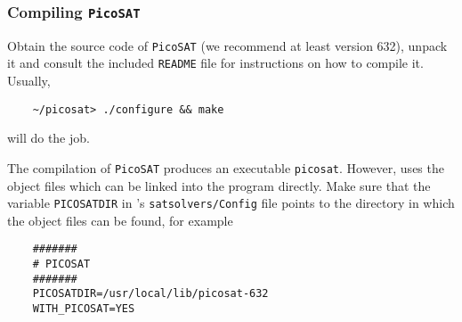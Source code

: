 


\subsubsection{Compiling \texttt{PicoSAT}}

Obtain the source code of \texttt{PicoSAT} (we recommend at least version 632), unpack it and
consult the included \texttt{README} file for instructions on how to compile it. Usually,
\begin{verbatim}
    ~/picosat> ./configure && make
\end{verbatim}
will do the job.

The compilation of \texttt{PicoSAT} produces an executable \texttt{picosat}. However, \pgsolver uses the
object files which can be linked into the program directly. Make sure that the variable
\verb#PICOSATDIR# in \pgsolver's \texttt{satsolvers/Config} file points to the directory in which the object files
can be found, for example
\begin{verbatim}
    #######
    # PICOSAT
    #######
    PICOSATDIR=/usr/local/lib/picosat-632
    WITH_PICOSAT=YES
\end{verbatim}


